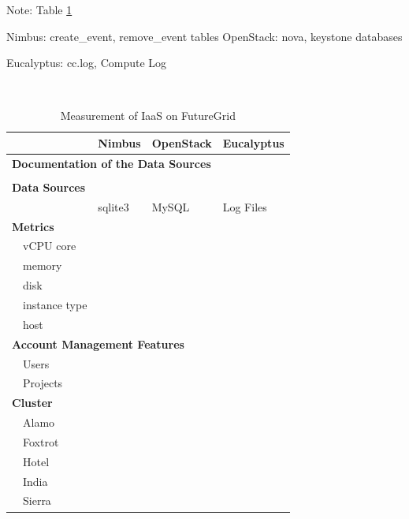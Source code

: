 \documentclass{tex/sig-alternate}
\begin{document}
{Note:
Table \ref{T:compare-iaas}

    Nimbus: create\_event, remove\_event tables 
    OpenStack: nova, keystone  databases 

    Eucalyptus: cc.log, Compute Log 


\newcommand{\YES}{\ding{51}}

\newcommand{\NO}{\ding{55}}


\begin{table}[h!]
  \caption{Measurement of IaaS on FutureGrid}\label{T:compare-iaas}
  ~\\
  \begin{small}
  \begin{tabularx}{\columnwidth}{|l|X|X|X|}
  \hline
                 & {\bf Nimbus} & {\bf OpenStack} & {\bf Eucalyptus} \\
    \hline
    \hline
    \multicolumn{4}{|l|}{\bf Documentation of the Data Sources} \\
    \hline
       & \NO & \YES & \YES \\
    \hline
    \hline
    \multicolumn{4}{|l|}{\bf Data Sources} \\
    \hline
         & sqlite3 & MySQL & Log Files \\
    \hline
    \hline
    \multicolumn{4}{|l|}{\bf Metrics} \\
    \hline
    ~~vCPU core & \YES & \YES & \YES \\
    ~~memory & \YES & \YES & \YES \\
    ~~disk & \YES & \YES & \YES \\
    ~~instance type   & \NO & \YES & \YES \\
    ~~host & \YES & \YES & \YES \\
    \hline
    \hline
    \multicolumn{4}{|l|}{\bf Account Management Features} \\
    \hline
    ~~Users     & \YES & \YES & \YES \\
    ~~Projects & \NO & \YES & \YES \\
    \hline
    \hline
    \multicolumn{4}{|l|}{\bf Cluster} \\
    \hline
    ~~Alamo  & \YES & \YES & \NO \\
    ~~Foxtrot & \YES & \NO & \NO \\
    ~~Hotel    & \YES & \YES & \NO \\
    ~~India     & \NO  & \YES & \YES \\
    ~~Sierra    & \YES & \YES & \YES \\

\end{tabularx}
\end{small}
\end{table}}
\end{document}
